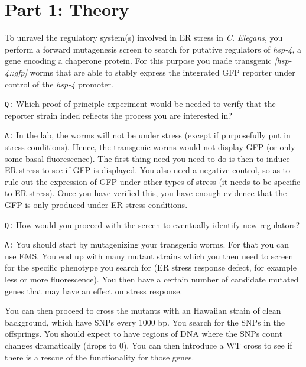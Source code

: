 \documentclass[11pt, a4paper,titlepage]{article}
\begin{document}

\setcounter{tocdepth}{3}

\tableofcontents
\newpage

\section*{Part 1: Theory}

To unravel the regulatory system(s) involved in ER stress in
\emph{C. Elegans}, you perform a forward mutagenesis screen to search
for putative regulators of \emph{hsp-4}, a gene encoding a chaperone
protein. For this purpose you made transgenic \emph{[hsp-4::gfp]}
worms that are able to stably express the integrated GFP reporter
under control of the \emph{hsp-4} promoter.
\bigskip

\noindent\texttt{Q:} Which proof-of-principle experiment would be needed to
verify that the reporter strain inded reflects the process you are
interested in?
\smallskip

\noindent\texttt{A:} In the lab, the worms will not be under stress
(except if purposefully put in stress conditions). Hence, the
transgenic worms would not display GFP (or only some basal
fluorescence). The first thing need you need to do is then to induce
ER stress to see if GFP is displayed. You also need a negative
control, so as to rule out the expression of GFP under other types of
stress (it needs to be specific to ER stress). Once you have verified
this, you have enough evidence that the GFP is only produced under ER
stress conditions.
\bigskip

\noindent\texttt{Q:} How would you proceed with the screen to
eventually identify new regulators?
\smallskip

\noindent\texttt{A:} You should start by mutagenizing your transgenic
worms. For that you can use EMS. You end up with many mutant strains
which you then need to screen for the specific phenotype you search
for (ER stress response defect, for example less or more
fluorescence). You then have a certain number of candidate mutated
genes that may have an effect on stress response.

You can then proceed to cross the mutants with an Hawaiian strain of
clean background, which have SNPs every 1000 bp. You search for the
SNPs in the offsprings. You should expect to have regions of DNA where
the SNPs count changes dramatically (drops to 0). You can then
introduce a WT cross to see if there is a rescue of the functionality
for those genes.
\end{document}
